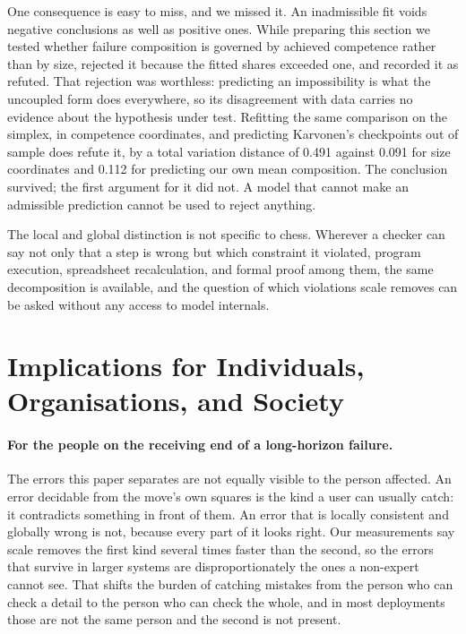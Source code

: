 \documentclass[11pt]{article}
\begin{document}
One consequence is easy to miss, and we missed it. An inadmissible fit voids
negative conclusions as well as positive ones. While preparing this section we
tested whether failure composition is governed by achieved competence rather than
by size, rejected it because the fitted shares exceeded one, and recorded it as
refuted. That rejection was worthless: predicting an impossibility is what the
uncoupled form does everywhere, so its disagreement with data carries no evidence
about the hypothesis under test. Refitting the same comparison on the simplex, in
competence coordinates, and predicting Karvonen's checkpoints out of sample does
refute it, by a total variation distance of 0.491 against
0.091 for size coordinates and 0.112 for predicting our
own mean composition. The conclusion survived; the first argument for it did not.
A model that cannot make an admissible prediction cannot be used to reject
anything.

The local and global distinction is not specific to chess. Wherever a checker can
say not only that a step is wrong but which constraint it violated, program
execution, spreadsheet recalculation, and formal proof among them, the same
decomposition is available, and the question of which violations scale removes can
be asked without any access to model internals.

\section{Implications for Individuals, Organisations, and Society}
\label{sec:implications}

\paragraph{For the people on the receiving end of a long-horizon failure.}
The errors this paper separates are not equally visible to the person affected. An
error decidable from the move's own squares is the kind a user can usually catch:
it contradicts something in front of them. An error that is locally consistent and
globally wrong is not, because every part of it looks right. Our measurements say
scale removes the first kind several times faster than the second, so the errors
that survive in larger systems are disproportionately the ones a non-expert cannot
see. That shifts the burden of catching mistakes from the person who can check a
detail to the person who can check the whole, and in most deployments those are not
the same person and the second is not present.
\end{document}

